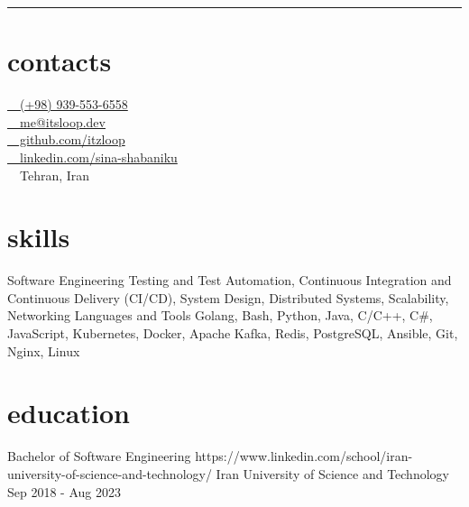 \documentclass[a4paper,20pt]{article}
\begin{document}
\begin{center}
\end{center}
\vspace*{1pt}
\begin{center}
\end{center}
\rule{\textwidth}{1pt}
\vspace{20pt}
\begin{minipage}[t]{0.3\textwidth}
  \preparetopsec
  \section{contacts}
  {
    \href{tel:+989395536558}{ \small~~(+98) 939-553-6558} \\ \vspace{6pt}  
    \href{mailto:me@itsloop.dev}{ \small~~me@itsloop.dev} \\ \vspace{6pt} 
    \href{https://github.com/itzloop}{ \small~~github.com/itzloop}\\ \vspace{6pt} 
    \href{https://linkedin.com/in/sina-shabaniku}{ \small~~linkedin.com/sina-shabaniku} \\ \vspace{6pt} 
     \small~~Tehran, Iran
    \vspace*{14pt}
  }

  \preparenormalsec
  \section{skills}
  {
    \skill
      {Software Engineering}
      {Testing and Test Automation, Continuous Integration and Continuous Delivery (CI/CD), System Design, Distributed Systems, Scalability, Networking}
    \vspace*{10pt}
    \skill
      {Languages and Tools}
      {Golang, Bash, Python, Java, C/C++, C\#, JavaScript, Kubernetes, Docker, Apache Kafka, Redis, PostgreSQL, Ansible, Git, Nginx, Linux}
  }
  \preparenormalsec
  \section{education}
  {
    \edu
      {Bachelor of Software Engineering}
      {https://www.linkedin.com/school/iran-university-of-science-and-technology/}
      {Iran University of Science and Technology}
      {Sep 2018 - Aug 2023}
    \vspace*{10pt}

}
\end{minipage}
\end{document}
